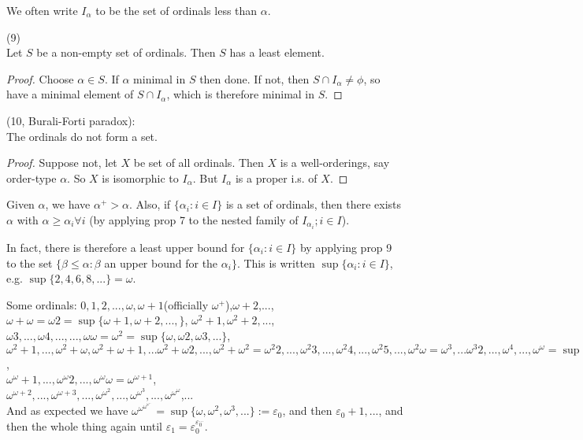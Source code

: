 \documentclass[a4paper]{article}
\begin{document}
We often write $I_\alpha$ to be the set of ordinals less than $\alpha$.

\begin{prop} (9)\\
Let $S$ be a non-empty set of ordinals. Then $S$ has a least element.
\begin{proof}
Choose $\alpha \in S$. If $\alpha$ minimal in $S$ then done. If not, then $S \cap I_\alpha \neq \phi$, so have a minimal element of $S\cap I_\alpha$, which is therefore minimal in $S$.
\end{proof}
\end{prop}

\begin{thm} (10, Burali-Forti paradox):\\
The ordinals do not form a set.
\begin{proof}
Suppose not, let $X$ be set of all ordinals. Then $X$ is a well-orderings, say order-type $\alpha$. So $X$ is isomorphic to $I_\alpha$. But $I_\alpha$ is a proper i.s. of $X$.
\end{proof}
\end{thm}

Given $\alpha$, we have $\alpha^+ > \alpha$. Also, if $\{\alpha_i:i \in I\}$ is a set of ordinals, then there exists $\alpha$ with $\alpha \geq \alpha_i \forall i$ (by applying prop 7 to the nested family of $I_{\alpha_i};i \in I$).

In fact, there is therefore a least upper bound for $\{\alpha_i: i \in I\}$ by applying prop 9 to the set $\{\beta \leq \alpha: \beta$ an upper bound for the $\alpha_i\}$. This is written $\sup\{\alpha_i:i \in I\}$, e.g. $\sup\{2,4,6,8,...\} = \omega$.

Some ordinals: $0,1,2,...,\omega,\omega+1$(officially $\omega^+$),$\omega+2$,...,\\
$\omega+\omega =\omega2 = \sup\{\omega+1,\omega+2,...,\}$, $\omega^2+1,\omega^2+2,...$,\\
$\omega3,...,\omega4,...,...,\omega\omega = \omega^2 = \sup\{\omega,\omega2,\omega3,...\}$,\\
$\omega^2+1,...,\omega^2+\omega,\omega^2+\omega+1,...\omega^2+\omega2,...,\omega^2+\omega^2=\omega^2 2,...,\omega^2 3,..., \omega^2 4,..., \omega^2 5,..., \omega^2 \omega = \omega^3, ...\omega^3 2,...,\omega^4,...,\omega^\omega = \sup\{\omega,\omega^2,\omega^3,...\}$,\\
$\omega^\omega+1,...,\omega^\omega 2,...,\omega^\omega \omega = \omega^{\omega+1}$,\\
$\omega^{\omega+2},...,\omega^{\omega+3},...,\omega^{\omega^2},...,\omega^{\omega^3},...,\omega^{\omega^\omega}$,...\\
And as expected we have $\omega^{\omega^{\omega^{\omega^{...}}}} = \sup\{\omega,\omega^2,\omega^3,...\} := \varepsilon_0$, and then $\varepsilon_0+1,...$, and then the whole thing again until $\varepsilon_1 = \varepsilon_0^{\varepsilon_0^{...}}$.
\end{document}
